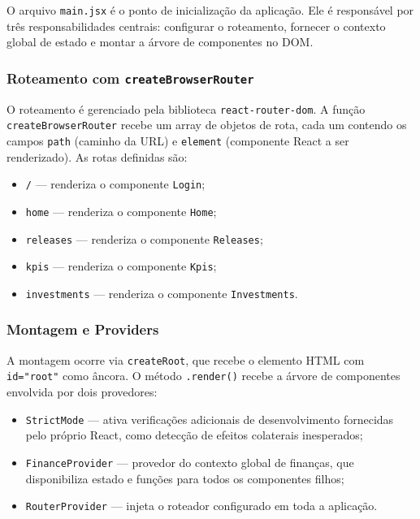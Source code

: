 \documentclass{article}
\begin{document}
O arquivo \texttt{main.jsx} é o ponto de inicialização da aplicação. Ele é responsável por três responsabilidades centrais: configurar o roteamento, fornecer o contexto global de estado e montar a árvore de componentes no DOM.

\subsubsection*{Roteamento com \texttt{createBrowserRouter}}

O roteamento é gerenciado pela biblioteca \texttt{react-router-dom}. A função \texttt{createBrowserRouter} recebe um array de objetos de rota, cada um contendo os campos \texttt{path} (caminho da URL) e \texttt{element} (componente React a ser renderizado). As rotas definidas são:

\begin{itemize}
  \item \texttt{/} — renderiza o componente \texttt{Login};
  \item \texttt{home} — renderiza o componente \texttt{Home};
  \item \texttt{releases} — renderiza o componente \texttt{Releases};
  \item \texttt{kpis} — renderiza o componente \texttt{Kpis};
  \item \texttt{investments} — renderiza o componente \texttt{Investments}.
\end{itemize}

\subsubsection*{Montagem e Providers}

A montagem ocorre via \texttt{createRoot}, que recebe o elemento HTML com \texttt{id="root"} como âncora. O método \texttt{.render()} recebe a árvore de componentes envolvida por dois provedores:

\begin{itemize}
  \item \texttt{StrictMode} — ativa verificações adicionais de desenvolvimento fornecidas pelo próprio React, como detecção de efeitos colaterais inesperados;
  \item \texttt{FinanceProvider} — provedor do contexto global de finanças, que disponibiliza estado e funções para todos os componentes filhos;
  \item \texttt{RouterProvider} — injeta o roteador configurado em toda a aplicação.
\end{itemize}
\end{document}
